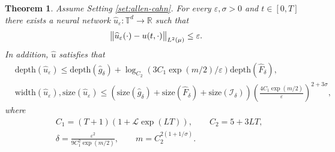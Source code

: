 \documentclass{article}
\numberwithin{equation}{section}
\newcommand{\size}{\mathrm{size}}
\newcommand{\width}{\mathrm{width}}
\newcommand{\depth}{\mathrm{depth}}
\newcommand{\T}{\mathbb{T}}
\newcommand{\R}{\mathbb{R}}
\newcommand{\cI}{\mathcal{I}}
\newcommand{\cL}{\mathcal{L}}
\newcommand{\uhat}{{\widehat{u}}}
\renewcommand{\epsilon}{\varepsilon}
\newcommand{\1}{\mathbbm{1}}
\newcommand{\Fhat}{\widehat{F}}
\newcommand{\ghat}{\widehat{g}}
\newtheorem{theorem}{Theorem}[section]
\begin{document}
\begin{theorem}\label{thm:nn}
Assume Setting \ref{set:allen-cahn}. For every $\epsilon, \sigma>0$ and $t\in [0,T]$ there exists a neural network $\uhat_\epsilon:\T^d\to\R$ such that
\begin{equation}
     \norm{\uhat_\epsilon(\cdot)-u(t,\cdot)}_{L^2(\mu)} \leq \epsilon. 
\end{equation}
In addition, $\uhat$ satisfies that
\begin{equation}
    \begin{split}
          &\depth(\uhat_\epsilon) \leq \depth(\ghat_{\delta})+\log_{C_2} (3C_1\exp(m/2)/\epsilon)\depth(\Fhat_{\delta}),\\
          &\width(\uhat_\epsilon), \size(\uhat_\epsilon) \leq  (\size(\ghat_{\delta})+ \size(\Fhat_{\delta})+ \size(\cI_{\delta})) \left(\frac{4C_1\exp(m/2)}{\epsilon}\right)^{2+3\sigma}, 
    \end{split}
\end{equation}
where
\begin{equation}
    \begin{split}
        &C_1 = (T+1)(1+\cL \exp(LT)), \qquad C_2 = 5+3LT,\\
        &\delta = \frac{\epsilon^2}{9C_1^2\exp(m/2)}, \qquad m = C_2^{2(1+1/\sigma)}.
    \end{split}
\end{equation}
\end{theorem}
\end{document}
